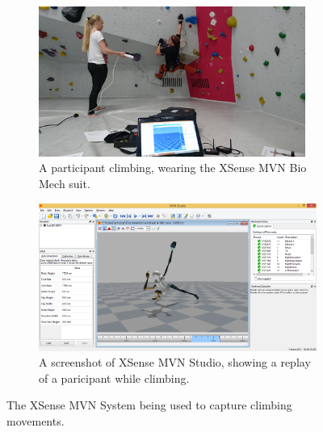 \begin{figure}[h]
    \centering
    \begin{subfigure}[b]{0.49\columnwidth}
        \centering
        \includegraphics[width=0.96\textwidth]{figures/images/Moven-In-Action.jpg}
        \caption{A participant climbing, wearing the XSense MVN Bio Mech suit.} \label{fig:mvn-in-use}
    \end{subfigure}
    \hspace*{\fill}
    \begin{subfigure}[b]{0.49\columnwidth}
        \centering
        \includegraphics[width=\textwidth]{figures/images/Moven-Screenshot.png}
        \caption{A screenshot of XSense MVN Studio, showing a replay of a paricipant while climbing.} \label{fig:mvn-screenshot}
    \end{subfigure}
    \caption{The XSense MVN System being used to capture climbing movements.}
    \label{fig:mvn-suit}
\end{figure}
